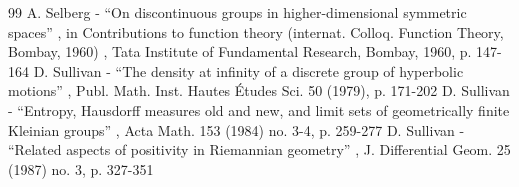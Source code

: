 \documentclass[10pt]{amsart}
\theoremstyle{plain}
\theoremstyle{definition}
\begin{document}
\begin{thebibliography}{99}
 A. Selberg - “On discontinuous groups in higher-dimensional symmetric spaces” , in Contributions to function theory (internat. Colloq. Function Theory, Bombay, 1960) , Tata Institute of Fundamental Research, Bombay, 1960, p. 147-164
 D. Sullivan - “The density at infinity of a discrete group of hyperbolic motions” , Publ. Math. Inst. Hautes Études Sci. 50 (1979), p. 171-202
 D. Sullivan - “Entropy, Hausdorff measures old and new, and limit sets of geometrically finite Kleinian groups” , Acta Math. 153 (1984) no. 3-4, p. 259-277
 D. Sullivan - “Related aspects of positivity in Riemannian geometry” , J. Differential Geom. 25 (1987) no. 3, p. 327-351
\end{thebibliography}
\end{document}
